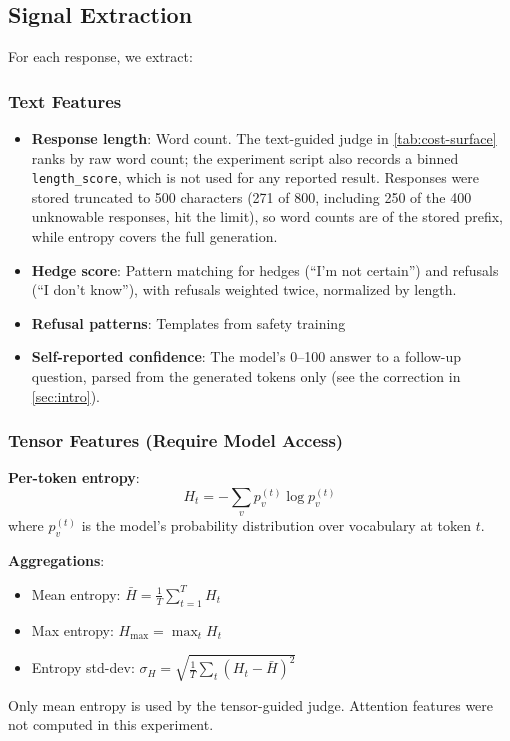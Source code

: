 \documentclass[11pt]{article}
\begin{document}
\subsection{Signal Extraction}

For each response, we extract:

\subsubsection{Text Features}
\begin{itemize}
    \item \textbf{Response length}: Word count. The text-guided judge in \autoref{tab:cost-surface} ranks by raw word count; the experiment script also records a binned \texttt{length\_score}, which is not used for any reported result. Responses were stored truncated to 500 characters (271 of 800, including 250 of the 400 unknowable responses, hit the limit), so word counts are of the stored prefix, while entropy covers the full generation.
    \item \textbf{Hedge score}: Pattern matching for hedges (``I'm not certain'') and refusals (``I don't know''), with refusals weighted twice, normalized by length.
    \item \textbf{Refusal patterns}: Templates from safety training
    \item \textbf{Self-reported confidence}: The model's 0--100 answer to a follow-up question, parsed from the generated tokens only (see the correction in \autoref{sec:intro}).
\end{itemize}

\subsubsection{Tensor Features (Require Model Access)}

\textbf{Per-token entropy}:
\begin{equation}
H_t = -\sum_v p_v^{(t)} \log p_v^{(t)}
\end{equation}
where $p_v^{(t)}$ is the model's probability distribution over vocabulary at token $t$.

\textbf{Aggregations}:
\begin{itemize}
    \item Mean entropy: $\bar{H} = \frac{1}{T} \sum_{t=1}^T H_t$
    \item Max entropy: $H_{\max} = \max_t H_t$
    \item Entropy std-dev: $\sigma_H = \sqrt{\frac{1}{T}\sum_t(H_t - \bar{H})^2}$
\end{itemize}
Only mean entropy is used by the tensor-guided judge. Attention features were not computed in this experiment.
\end{document}
